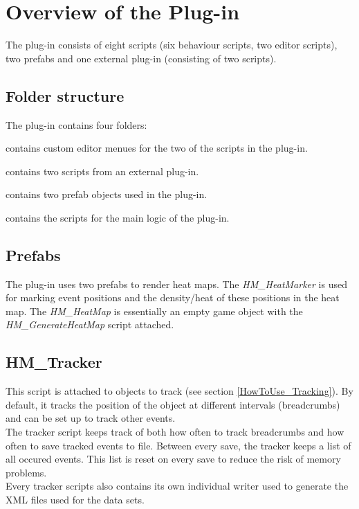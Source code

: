 \section{Overview of the Plug-in}
\label{CO}
The plug-in consists of eight scripts (six behaviour scripts, two editor scripts), two prefabs and one external plug-in (consisting of two scripts). 

\subsection{Folder structure}
\label{CO_FStructure}
The plug-in contains four folders:
\begin{my_enumerate}
\item [\textit{Editor}] contains custom editor menues for the two of the scripts in the plug-in.
\item [\textit{Plugins}] contains two scripts from an external plug-in.
\item [\textit{Prefabs}] contains two prefab objects used in the plug-in.
\item [\textit{Scripts}] contains the scripts for the main logic of the plug-in.
\end{my_enumerate}

\subsection{Prefabs}
\label{CO_Prefabs}
The plug-in uses two prefabs to render heat maps. The \textit{HM\_HeatMarker} is used for marking event positions and the density/heat of these positions in the heat map. The \textit{HM\_HeatMap} is essentially an empty game object with the \textit{HM\_GenerateHeatMap} script attached.

\subsection{HM\_Tracker}
\label{CO_Tracker}
This script is attached to objects to track (see section \ref{HowToUse_Tracking}). By default, it tracks the position of the object at different intervals (breadcrumbs) and can be set up to track other events. 
\\The tracker script keeps track of both how often to track breadcrumbs and how often to save tracked events to file. Between every save, the tracker keeps a list of all occured events. This list is reset on every save to reduce the risk of memory problems. 
\\Every tracker scripts also contains its own individual writer used to generate the XML files used for the data sets.

